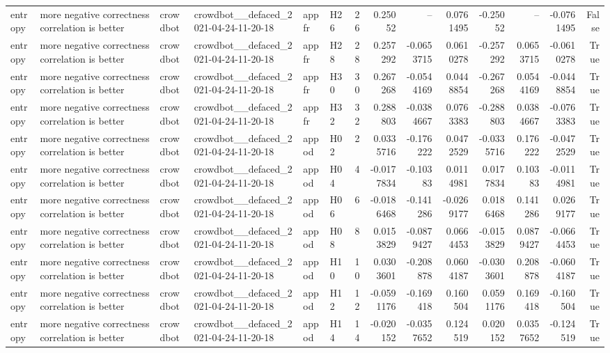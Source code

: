 \begin{longtable}{llllllrrrrrrrr}
entropy & more negative correctness correlation is better & crowdbot & crowdbot\_\_defaced\_2021-04-24-11-20-18 & appfr & H26 & 26 & 0.25052 & -- & 0.0761495 & -0.25052 & -- & -0.0761495 & False \\
entropy & more negative correctness correlation is better & crowdbot & crowdbot\_\_defaced\_2021-04-24-11-20-18 & appfr & H28 & 28 & 0.257292 & -0.0653715 & 0.0610278 & -0.257292 & 0.0653715 & -0.0610278 & True \\
entropy & more negative correctness correlation is better & crowdbot & crowdbot\_\_defaced\_2021-04-24-11-20-18 & appfr & H30 & 30 & 0.267268 & -0.0544169 & 0.0448854 & -0.267268 & 0.0544169 & -0.0448854 & True \\
entropy & more negative correctness correlation is better & crowdbot & crowdbot\_\_defaced\_2021-04-24-11-20-18 & appfr & H32 & 32 & 0.288803 & -0.0384667 & 0.0763383 & -0.288803 & 0.0384667 & -0.0763383 & True \\
entropy & more negative correctness correlation is better & crowdbot & crowdbot\_\_defaced\_2021-04-24-11-20-18 & appod & H02 & 2 & 0.0335716 & -0.176222 & 0.0472529 & -0.0335716 & 0.176222 & -0.0472529 & True \\
entropy & more negative correctness correlation is better & crowdbot & crowdbot\_\_defaced\_2021-04-24-11-20-18 & appod & H04 & 4 & -0.0177834 & -0.10383 & 0.0114981 & 0.0177834 & 0.10383 & -0.0114981 & True \\
entropy & more negative correctness correlation is better & crowdbot & crowdbot\_\_defaced\_2021-04-24-11-20-18 & appod & H06 & 6 & -0.0186468 & -0.141286 & -0.0269177 & 0.0186468 & 0.141286 & 0.0269177 & True \\
entropy & more negative correctness correlation is better & crowdbot & crowdbot\_\_defaced\_2021-04-24-11-20-18 & appod & H08 & 8 & 0.0153829 & -0.0879427 & 0.0664453 & -0.0153829 & 0.0879427 & -0.0664453 & True \\
entropy & more negative correctness correlation is better & crowdbot & crowdbot\_\_defaced\_2021-04-24-11-20-18 & appod & H10 & 10 & 0.0303601 & -0.208878 & 0.0604187 & -0.0303601 & 0.208878 & -0.0604187 & True \\
entropy & more negative correctness correlation is better & crowdbot & crowdbot\_\_defaced\_2021-04-24-11-20-18 & appod & H12 & 12 & -0.0591176 & -0.169418 & 0.160504 & 0.0591176 & 0.169418 & -0.160504 & True \\
entropy & more negative correctness correlation is better & crowdbot & crowdbot\_\_defaced\_2021-04-24-11-20-18 & appod & H14 & 14 & -0.020152 & -0.0357652 & 0.124519 & 0.020152 & 0.0357652 & -0.124519 & True \\

\end{longtable}
